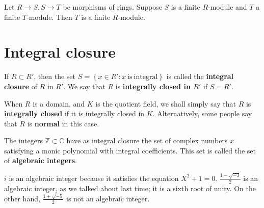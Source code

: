 \begin{exercise} 
Let $R \to S, S \to T$ be morphisms of rings. Suppose $S$ is a finite
$R$-module and $T$ a finite $T$-module. Then $T$ is a finite $R$-module.
\end{exercise} 

\section{Integral closure}
\begin{definition} 
If $R \subset R'$, then the set $S = \left\{x \in R': x \ \mathrm{is \
integral  }\right\}$ is called the \textbf{integral closure} of $R$ in $R'$. We
say that $R$ is \textbf{integrally closed in $R'$} if $S = R'$. 


When $R$ is a domain, and $K$ is the quotient field,  we shall simply
say that $R$ is \textbf{integrally closed} if it is integrally closed in
$K$.
Alternatively, some people say that $R$ is \textbf{normal} in this case.
\end{definition} 

\begin{example} 
The integers $\mathbb{Z} \subset \mathbb{C}$ have as integral closure the set
of complex numbers $x$ satisfying a monic polynomial with integral
coefficients.  This set is called the set of \textbf{algebraic integers}.
\end{example} 

\begin{example} 
$i$ is an algebraic integer because it satisfies the equation $X^2 +1 = 0$.
$\frac{1 - \sqrt{-3}}{2}$ is an algebraic integer, as we talked about last
time; it is a sixth root of unity.  On the other hand, $\frac{1+\sqrt{-5}}{2}$
is not an algebraic integer. 
\end{example} 


